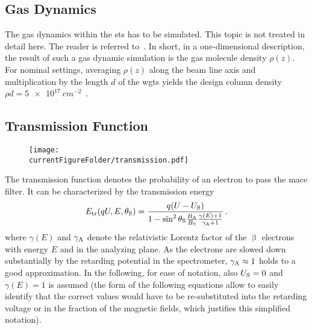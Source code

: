 \subsection{Gas Dynamics}
\label{sec:intSpecModelResponseGasDynamics}
The gas dynamics within the \gls{sts} has to be simulated. This topic is not treated in detail here. The reader is referred to~\cite{Hoetzel2012, Heizmann2018, Kuckert2018, Kuckert2016}. In short, in a one-dimensional description, the result of such a gas dynamic simulation is the gas molecule density $\rho(z)$. For nominal settings, averaging $\rho(z)$ along the beam line axis and multiplication by the length $d$ of the \gls{wgts} yields the design column density $\rho d = \SI{5e17}{cm^{-2}}$~\cite{Angrik:2005ep}.

\subsection{Transmission Function}
\label{sec:intSpecModelResponseTransmission}
\begin{figure}
	\centering
	\texttt{[image: \\currentFigureFolder/transmission.pdf]}
	\label{fig:intSpecModelTransmission}
\end{figure}
The transmission function denotes the probability of an electron to pass the \gls{mace} filter. It can be characterized by the transmission energy~\cite{Groh2015}
\begin{equation}
\label{eq:intSpecModelTransmissionEnergy}
E_\mathrm{tr}(qU,E,\theta_\mathrm{S}) = 
\frac{
	q(U-U_\mathrm{S})
}{
	1-\sin^2\theta_\mathrm{S} \frac{B_\mathrm{A}}{B_\mathrm{S}} \frac{\gamma(E)+1}{\gamma_\mathrm{A}+1}
}
\text{\,.}
\end{equation}
where $\gamma(E)$ and $\gamma_\mathrm{A}$ denote the relativistic Lorentz factor of the $\upbeta$ electrons with energy $E$ and in the analyzing plane. As the electrons are slowed down substantially by the retarding potential in the spectrometer, $\gamma_\mathrm{A}\approx1$ holds to a good approximation. In the following, for ease of notation, also $U_\mathrm{S}=0$ and $\gamma(E)=1$ is assumed (the form of the following equations allow to easily identify that the correct values would have to be re-substituted into the retarding voltage or in the fraction of the magnetic fields, which justifies this simplified notation).

